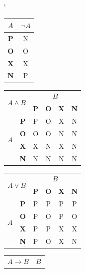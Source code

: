 \documentclass[11pt, ]{article}
\begin{document}
\begin{table}[h!]
\catcode`
    \centering
    \begin{tabular}{|c|c|}
        \hline
        $A$    & $\neg A$ \\
        \hline
        \textbf{P}    & N \\
        \textbf{O}    & O \\
        \textbf{X}    & X \\
        \textbf{N}    & P \\
        \hline
    \end{tabular}
    \begin{tabular}{|c|c|c|c|c|c|}
        \hline
        \multicolumn{2}{|c|}{\multirow{2}{*}{$A \wedge B$}} & \multicolumn{4}{c|}{$B$}\\ \cline{3-6}
        \multicolumn{2}{|c|}{}&\textbf{P}&\textbf{O}&\textbf{X}&\textbf{N}\\
        \hline
        \multirow{4}{*}{$$A$$}
        &\textbf{P} &    P   &   O   &   X   &   N\\
        \cline{2-6}
        &\textbf{O} &    O   &   O   &   N   &   N\\
        \cline{2-6}
        &\textbf{X} &    X   &   N   &   X   &   N\\
        \cline{2-6}
        &\textbf{N} &    N   &   N   &   N   &   N\\
        \hline
    \end{tabular}
    \begin{tabular}{|c|c|c|c|c|c|}
        \hline
        \multicolumn{2}{|c|}{\multirow{2}{*}{$A \vee B$}} & \multicolumn{4}{c|}{$B$}\\ \cline{3-6}
        \multicolumn{2}{|c|}{}&\textbf{P}&\textbf{O}&\textbf{X}&\textbf{N}\\
        \hline
        \multirow{4}{*}{$$A$$}
        &\textbf{P}  &   P   &   P   &   P   &   P\\
        \cline{2-6}
        &\textbf{O}  &   P   &   O   &   P   &   O\\
        \cline{2-6}
        &\textbf{X}  &   P   &   P   &   X   &   X\\
        \cline{2-6}
        &\textbf{N}  &   P   &   O   &   X   &   N\\
        \hline
    \end{tabular}
    \begin{tabular}{|c|c|c|c|c|c|}
        \hline
        \multicolumn{2}{|c|}{\multirow{2}{*}{$A \rightarrow B$}} & \multicolumn{4}{c|}{$B$}\\ \cline{3-6}

\end{tabular}
\end{table}
\end{document}
